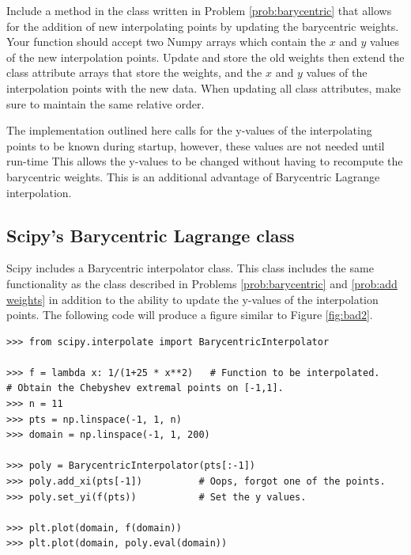 \begin{problem}
\label{prob:add weights}
Include a method in the class written in Problem \ref{prob:barycentric} that allows for the addition of new interpolating points by updating the barycentric weights.
Your function should accept two Numpy arrays which contain the $x$ and $y$ values of the new interpolation points.
Update and store the old weights then extend the class attribute arrays that store the weights, and the $x$ and $y$ values of the interpolation points with the new data.
When updating all class attributes, make sure to maintain the same relative order.
\end{problem}

The implementation outlined here calls for the y-values of the interpolating points to be known during startup, however, these values are not needed until run-time
This allows the y-values to be changed without having to recompute the barycentric weights.
This is an additional advantage of Barycentric Lagrange interpolation.

\subsection*{Scipy's Barycentric Lagrange class}
Scipy includes a Barycentric interpolator class.
This class includes the same functionality as the class described in Problems \ref{prob:barycentric} and \ref{prob:add weights} in addition to the ability to update the y-values of the interpolation points.
The following code will produce a figure similar to Figure \ref{fig:bad2}.
\begin{lstlisting}
>>> from scipy.interpolate import BarycentricInterpolator

>>> f = lambda x: 1/(1+25 * x**2)   # Function to be interpolated.
# Obtain the Chebyshev extremal points on [-1,1].
>>> n = 11
>>> pts = np.linspace(-1, 1, n)
>>> domain = np.linspace(-1, 1, 200)

>>> poly = BarycentricInterpolator(pts[:-1])
>>> poly.add_xi(pts[-1])          # Oops, forgot one of the points.
>>> poly.set_yi(f(pts))           # Set the y values.

>>> plt.plot(domain, f(domain))
>>> plt.plot(domain, poly.eval(domain))
\end{lstlisting}

